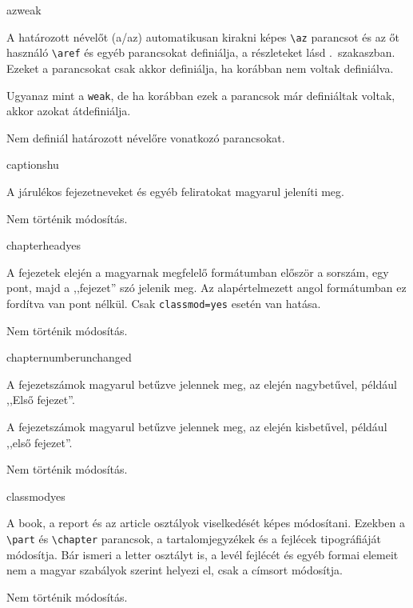 \documentclass[12pt]{article}
\begin{document}
\begin{description}
\begin{hunopt}{az}{weak}
\item[weak]
A határozott névelőt (a/az) automatikusan kirakni képes \verb|\az| parancsot és az őt használó \verb|\aref| és egyéb parancsokat definiálja, a részleteket lásd .~szakaszban.
Ezeket a parancsokat csak akkor definiálja, ha korábban nem voltak definiálva.
\item[yes]
Ugyanaz mint a \texttt{weak}, de ha korábban ezek a parancsok már definiáltak voltak, akkor azokat átdefiniálja.
\item[no]
Nem definiál határozott névelőre vonatkozó parancsokat.
\end{hunopt}

\begin{hunopt}{captions}{hu}
\item[hu]
A járulékos fejezetneveket és egyéb feliratokat magyarul jeleníti meg.
\item[unchanged]
Nem történik módosítás.
\end{hunopt}

\begin{hunopt}{chapterhead}{yes}
\item[yes]
A fejezetek elején a magyarnak megfelelő formátumban először a sorszám, egy pont, majd a ,,fejezet'' szó jelenik meg.
Az alapértelmezett angol formátumban ez fordítva van pont nélkül.
Csak \texttt{classmod=yes} esetén van hatása.
\item[unchanged]
Nem történik módosítás.
\end{hunopt}

\begin{hunopt}{chapternumber}{unchanged}
\item[Huordinal]
A fejezetszámok magyarul betűzve jelennek meg, az elején nagybetűvel, például ,,Első fejezet''.
\item[huordinal]
A fejezetszámok magyarul betűzve jelennek meg, az elején kisbetűvel, például ,,első fejezet''.
\item[unchanged]
Nem történik módosítás.
\end{hunopt}

\begin{hunopt}{classmod}{yes}
\item[yes]
A \textsf{book}, a \textsf{report} és az \textsf{article} osztályok viselkedését képes módosítani.
Ezekben a \verb|\part| és \verb|\chapter| parancsok, a tartalomjegyzékek és a fejlécek tipográfiáját módosítja.
Bár ismeri a \textsf{letter} osztályt is, a levél fejlécét és egyéb formai elemeit nem a magyar szabályok szerint helyezi el, csak a címsort módosítja.
\item[unchanged]
Nem történik módosítás.
\end{hunopt}


\end{description}
\end{document}
